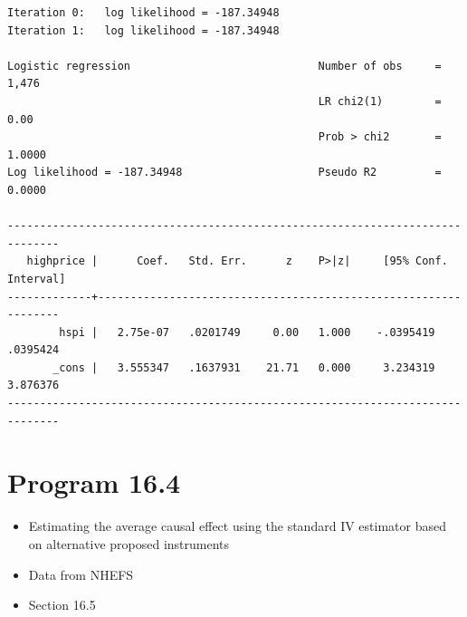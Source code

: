 \documentclass[
  10pt,
]{book}
\providecommand{\tightlist}{%
  \setlength{\itemsep}{0pt}\setlength{\parskip}{0pt}}
\begin{document}
\begin{verbatim}
Iteration 0:   log likelihood = -187.34948  
Iteration 1:   log likelihood = -187.34948  

Logistic regression                             Number of obs     =      1,476
                                                LR chi2(1)        =       0.00
                                                Prob > chi2       =     1.0000
Log likelihood = -187.34948                     Pseudo R2         =     0.0000

------------------------------------------------------------------------------
   highprice |      Coef.   Std. Err.      z    P>|z|     [95% Conf. Interval]
-------------+----------------------------------------------------------------
        hspi |   2.75e-07   .0201749     0.00   1.000    -.0395419    .0395424
       _cons |   3.555347   .1637931    21.71   0.000     3.234319    3.876376
------------------------------------------------------------------------------
\end{verbatim}

\hypertarget{program-16.4-1}{%
\section{Program 16.4}\label{program-16.4-1}}

\begin{itemize}
\tightlist
\item
  Estimating the average causal effect using the standard IV estimator based on alternative proposed instruments
\item
  Data from NHEFS
\item
  Section 16.5
\end{itemize}
\end{document}

